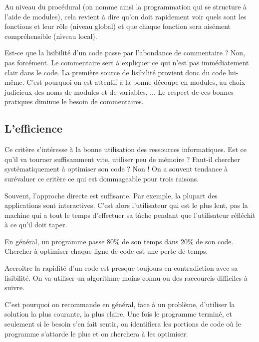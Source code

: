 	{
	Au niveau du procédural (on nomme ainsi la programmation qui se
	structure à l'aide de modules), cela revient à dire
	qu'on doit rapidement voir quels sont les fonctions et
	leur rôle (niveau global) et que chaque fonction sera aisément
	compréhensible (niveau local). }
	
	{
	Est-ce que la lisibilité d'un code passe par
	l'abondance de commentaire ? Non, pas forcément. Le
	commentaire sert à expliquer ce qui n'est pas
	immédiatement clair dans le code. La première source de lisibilité
	provient donc du code lui-même. C'est pourquoi on est
	attentif à la bonne découpe en modules, au choix judicieux des noms de
	modules et de variables, ... Le respect de ces bonnes pratiques diminue
	le besoin de commentaires.}
	
\subsection{L'efficience}

	{
	Ce critère s'intéresse à la bonne utilisation des
	ressources informatiques. Est ce qu'il va tourner
	suffisamment vite, utiliser peu de mémoire ? Faut-il chercher
	systématiquement à optimiser son code ? Non ! On a souvent tendance à
	surévaluer ce critère ce qui est dommageable pour trois raisons.}

	\begin{liste}
	\item {
		Souvent, l'approche directe est suffisante. Par
		exemple, la plupart des applications sont interactives.
		C'est alors l’utilisateur qui est le plus lent, pas la
		machine qui a tout le temps d'effectuer sa tâche
		pendant que l’utilisateur réfléchit à ce qu'il doit
		taper.}
	\item {
		En général, un programme passe 80\% de son temps dans 20\% de son code.
		Chercher à optimiser chaque ligne de code est une perte de temps.}
	\item {
		Accroitre la rapidité d'un code est presque toujours en
		contradiction avec sa lisibilité. On va utiliser un algorithme moins
		connu ou des raccourcis difficiles à suivre.}
	\end{liste}

	{
	C'est pourquoi on recommande en général, face à un
	problème, d'utiliser la solution la plus courante, la
	plus claire. Une fois le programme terminé, et seulement si le besoin
	s'en fait sentir, on identifiera les portions de code
	où le programme s'attarde le plus et on cherchera à
	les optimiser.}

